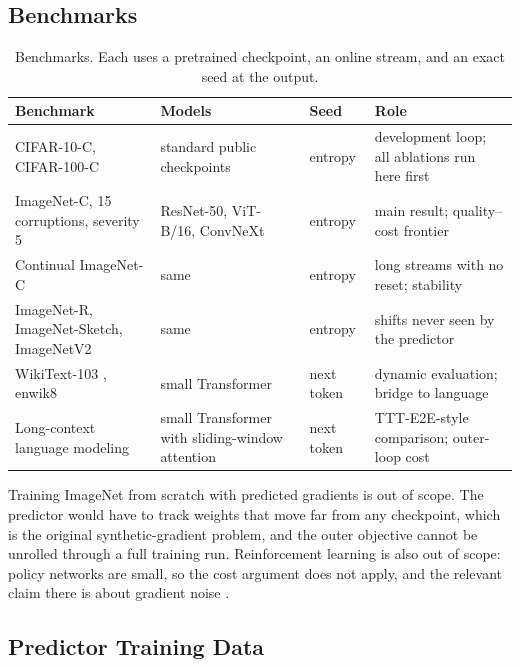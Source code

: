 \documentclass{article}
\begin{document}
\subsection{Benchmarks}

\begin{table}[ht]
\centering
\small
\begin{tabular}{L{3.9cm} L{3.5cm} L{2.0cm} L{5.2cm}}
\toprule
Benchmark & Models & Seed & Role \\
\midrule
CIFAR-10-C, CIFAR-100-C \parencite{hendrycks2019imagenetc}
  & standard public checkpoints & entropy & development loop; all ablations run here first \\
ImageNet-C, 15 corruptions, severity 5
  & ResNet-50, ViT-B/16, ConvNeXt \parencite{he2016resnet,dosovitskiy2021vit,liu2022convnext}
  & entropy & main result; quality--cost frontier \\
Continual ImageNet-C \parencite{wang2022cotta}
  & same & entropy & long streams with no reset; stability \\
ImageNet-R, ImageNet-Sketch, ImageNetV2
  \parencite{hendrycks2021imagenetr,wang2019sketch,recht2019imagenetv2}
  & same & entropy & shifts never seen by the predictor \\
WikiText-103 \parencite{merity2017wikitext}, enwik8
  & small Transformer & next token & dynamic evaluation; bridge to language \\
Long-context language modeling
  & small Transformer with sliding-window attention & next token
  & TTT-E2E-style comparison; outer-loop cost \\
\bottomrule
\end{tabular}
\caption{Benchmarks. Each uses a pretrained checkpoint, an online stream, and
an exact seed at the output.}
\label{tab:benchmarks}
\end{table}

Training ImageNet from scratch with predicted gradients is out of scope. The
predictor would have to track weights that move far from any checkpoint, which
is the original synthetic-gradient problem, and the outer objective cannot be
unrolled through a full training run. Reinforcement learning is also out of
scope: policy networks are small, so the cost argument does not apply, and the
relevant claim there is about gradient noise \parencite{zhang2026backprop}.

\subsection{Predictor Training Data}
\end{document}
